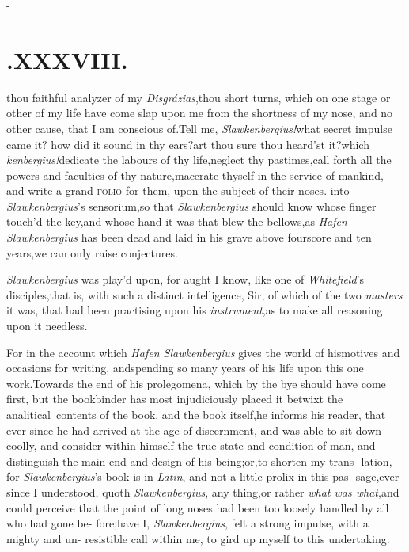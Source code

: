 \documentclass{article}
\begin{document}
\null\kern-\baselineskip
\section{.\quad  XXXVIII.}

\@ thou faithful
analyzer of my \textit{Disgrázias},\tsk thou 
short turns, which on one stage
or other of my life have come slap upon me from the
shortness of my nose, and no other cause, that I am
conscious of.\tsk Tell me, \textit{Slawkenbergius!}\@ what
secret impulse 
came it? how did it sound in thy ears?\tsk art thou sure thou
heard’st it?\tsk which 
\break\textit{kenbergius!}\@ dedicate the labours of thy
life,\tsk neglect thy pastimes,\tsk call forth all the
powers and faculties of thy nature,\break\tsh macerate thyself in
the service of mankind, and write a grand \textsc{folio} for
them, upon the subject of their noses.\hfill{}
into \textit{Slawkenbergius}’s sensorium,\tsk so that
\textit{Slawkenbergius} should know whose finger touch’d the
key,\tsh and whose hand it was that blew the bellows,\tsh as
\textit{Hafen Slawkenbergius} has been dead and laid in his
grave above fourscore and ten years,\tsh we can only raise
conjectures.

\textit{Slawkenbergius} was play’d upon, for aught I know,
like one of \textit{Whitefield}’s disciples,\tsk that
is, with such a distinct\break
intelligence, Sir, of which of the two
\textit{masters} it was, that had been practising upon his
\textit{instrument},\tsh as to make all reasoning upon it
needless.

\tsh For in the account which \textit{Hafen Slawkenbergius}
gives the world of his\break motives and occasions for
writing, and\break spending so many years of his life
upon this one work.\tsk Towards the end of his
prolegomena, which by the bye should have come first,\tsh
but the bookbinder has most injudiciously placed it betwixt
the analitical\sic\ contents of the book, and the book
itself,\tsk he informs his reader, that ever since he had
arrived at the age of discernment, and was able to sit down
coolly, and consider within himself the true state and
condition of man, and distinguish the main end and design of
his being;\tsk or,\tsk to shorten my trans-\break
lation, for \textit{Slawkenbergius}’s book is in\break
\textit{Latin}, and not a little prolix in this pas-\break
sage,\tsk ever since I understood, quoth\break
\textit{Slawkenbergius}, any thing,\tsk or rather\break
\textit{what was what},\tsk and could perceive\break
that the point of long noses had been too\break
loosely handled by all who had gone be-\break 
fore;\tsh have I, \textit{Slawkenbergius}, felt a\break
strong impulse, with a mighty and un- resistible call
within me, to gird up myself to this undertaking.
\end{document}
